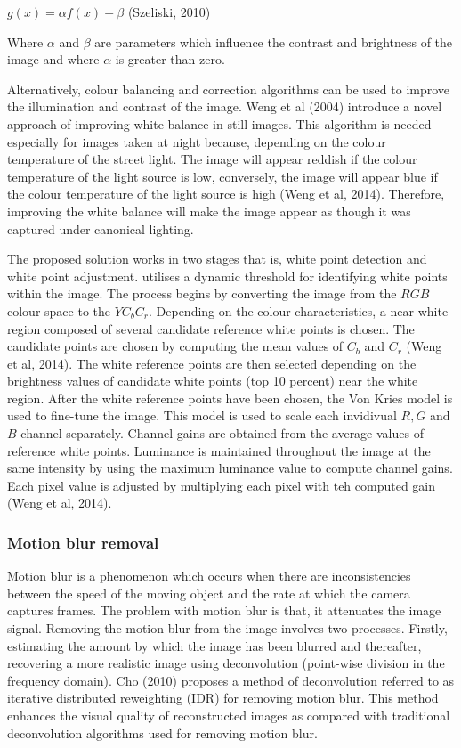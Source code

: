 \documentclass[a4paper, 12pt]{article}
\begin{document}
\begin{center}
 $g(x) = \alpha f(x) + \beta$ 	(Szeliski, 2010)
\end{center}

Where $\alpha$ and $\beta$ are parameters which influence the contrast and brightness of the image and where $\alpha$ is greater than zero. 

Alternatively, colour balancing and correction algorithms can be used to improve the illumination and contrast of the image. Weng et al (2004) introduce a novel approach of improving white balance in still images. This algorithm is needed especially for images taken at night because, depending on the colour temperature of the street light. The image will appear reddish if the colour temperature of the light source is low, conversely, the image will appear blue if the colour temperature of the light source is high (Weng et al, 2014). Therefore, improving the white balance will make the image appear as though it was captured under canonical lighting. 
\parskip 0.2in

The proposed solution works in two stages that is, white point detection and white point adjustment. utilises a dynamic threshold for identifying white points within the image. The process begins by converting the image from the $RGB$ colour space to the  $YC_{b}C_{r}$. Depending on the colour characteristics, a near white region composed of several candidate reference white points is chosen. The candidate points are chosen by computing the mean values of $C_{b}$ and $C_{r}$ (Weng et al, 2014). The white reference points are then selected depending on the brightness values  of candidate white points (top 10 percent) near the white region. After the white reference points have been chosen, the Von Kries model is used to fine-tune the image. This model is used to scale each invidivual $R, G$ and $B$ channel separately. Channel gains are obtained from the average values of reference white points. Luminance is maintained throughout the image at the same intensity by using the maximum luminance value to compute channel gains. Each pixel value is adjusted by multiplying each pixel with teh computed gain (Weng et al, 2014). 

\subsubsection{ Motion blur removal}

Motion blur is a phenomenon which occurs when there are inconsistencies between the speed of the moving object and the rate at which the camera captures frames. The problem with motion blur is that, it attenuates the image signal. Removing the motion blur from the image involves two processes. Firstly, estimating the amount by which the image has been blurred and thereafter, recovering a more realistic image using  deconvolution (point-wise division in the frequency domain). Cho (2010) proposes a method of deconvolution referred to as iterative distributed reweighting (IDR) for removing motion blur. This method enhances the visual quality of reconstructed images as compared with traditional deconvolution algorithms used for removing motion blur.
\parskip 0.2in 
\end{document}
